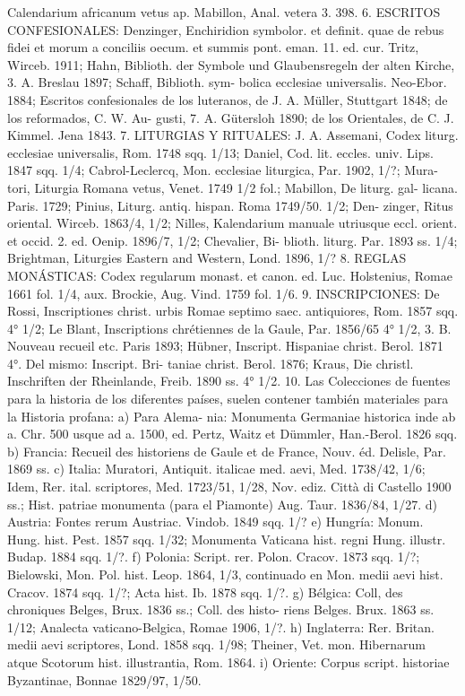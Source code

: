 \raggedbottom{} \documentclass[12pt, a4paper]{book}
\begin{document}
Calendarium africanum vetus ap. Mabillon, Anal. vetera 3. 398.
6. ESCRITOS CONFESIONALES: Denzinger, Enchiridion symbolor. et
definit. quae de rebus fidei et morum a conciliis oecum. et summis pont.
eman. 11. ed. cur. Tritz, Wirceb. 1911; Hahn, Biblioth. der Symbole und
Glaubensregeln der alten Kirche, 3. A. Breslau 1897; Schaff, Biblioth. sym-
bolica ecclesiae universalis. Neo-Ebor. 1884; Escritos confesionales de los
luteranos, de J. A. Müller, Stuttgart 1848; de los reformados, C. W. Au-
gusti, 7. A. Gütersloh 1890; de los Orientales, de C. J. Kimmel. Jena 1843.
7. LITURGIAS Y RITUALES: J. A. Assemani, Codex liturg. ecclesiae
universalis, Rom. 1748 sqq. 1/13; Daniel, Cod. lit. eccles. univ. Lips. 1847
sqq. 1/4; Cabrol-Leclercq, Mon. ecclesiae liturgica, Par. 1902, 1/?; Mura-
tori, Liturgia Romana vetus, Venet. 1749 1/2 fol.; Mabillon, De liturg. gal-
licana. Paris. 1729; Pinius, Liturg. antiq. hispan. Roma 1749/50. 1/2; Den-
zinger, Ritus oriental. Wirceb. 1863/4, 1/2; Nilles, Kalendarium manuale
utriusque eccl. orient. et occid. 2. ed. Oenip. 1896/7, 1/2; Chevalier, Bi-
blioth. liturg. Par. 1893 ss. 1/4; Brightman, Liturgies Eastern and Western,
Lond. 1896, 1/?
8. REGLAS MONÁSTICAS: Codex regularum monast. et canon. ed. Luc.
Holstenius, Romae 1661 fol. 1/4, aux. Brockie, Aug. Vind. 1759 fol. 1/6.
9. INSCRIPCIONES: De Rossi, Inscriptiones christ. urbis Romae septimo
saec. antiquiores, Rom. 1857 sqq. 4° 1/2; Le Blant, Inscriptions chrétiennes
de la Gaule, Par. 1856/65 4° 1/2, 3. B. Nouveau recueil etc. Paris 1893;
Hübner, Inscript. Hispaniae christ. Berol. 1871 4°. Del mismo: Inscript. Bri-
taniae christ. Berol. 1876; Kraus, Die christl. Inschriften der Rheinlande,
Freib. 1890 ss. 4° 1/2.
10. Las Colecciones de fuentes para la historia de los diferentes países,
suelen contener también materiales para la Historia profana: a) Para Alema-
nia: Monumenta Germaniae historica inde ab a. Chr. 500 usque ad a. 1500,
ed. Pertz, Waitz et Dümmler, Han.-Berol. 1826 sqq. b) Francia: Recueil
des historiens de Gaule et de France, Nouv. éd. Delisle, Par. 1869 ss.
c) Italia: Muratori, Antiquit. italicae med. aevi, Med. 1738/42, 1/6; Idem,
Rer. ital. scriptores, Med. 1723/51, 1/28, Nov. ediz. Città di Castello
1900 ss.; Hist. patriae monumenta (para el Piamonte) Aug. Taur. 1836/84,
1/27. d) Austria: Fontes rerum Austriac. Vindob. 1849 sqq. 1/? e) Hungría:
Monum. Hung. hist. Pest. 1857 sqq. 1/32; Monumenta Vaticana hist. regni
Hung. illustr. Budap. 1884 sqq. 1/?. f) Polonia: Script. rer. Polon. Cracov.
1873 sqq. 1/?; Bielowski, Mon. Pol. hist. Leop. 1864, 1/3, continuado en
Mon. medii aevi hist. Cracov. 1874 sqq. 1/?; Acta hist. Ib. 1878 sqq. 1/?.
g) Bélgica: Coll, des chroniques Belges, Brux. 1836 ss.; Coll. des histo-
riens Belges. Brux. 1863 ss. 1/12; Analecta vaticano-Belgica, Romae 1906,
1/?. h) Inglaterra: Rer. Britan. medii aevi scriptores, Lond. 1858 sqq. 1/98;
Theiner, Vet. mon. Hibernarum atque Scotorum hist. illustrantia, Rom.
1864. i) Oriente: Corpus script. historiae Byzantinae, Bonnae 1829/97, 1/50.
\end{document}
